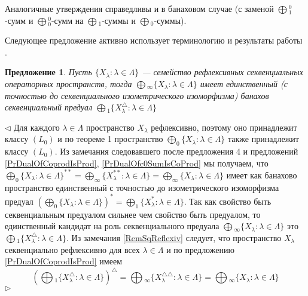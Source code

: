 \documentclass[12pt]{article}
\newtheorem{proposition}[theorem]{Предложение}
\newenvironment{proof}{\par $\triangleleft$}{$\triangleright$}
\begin{document}
Аналогичные утверждения справедливы и в банаховом случае (с заменой $\bigoplus{}_1^0$-сумм и $\bigoplus{}_0^0$-сумм на $\bigoplus{}_1$-суммы и $\bigoplus{}_0$-суммы).

Следующее предложение активно использует терминологию и результаты работы \cite{BrownItoUniquePredual}.

\begin{proposition}\label{PrUniquePredualForCoproduct}
Пусть $\{X_\lambda:\lambda\in\Lambda\}$ --- семейство рефлексивных секвенциальных операторных пространств, тогда $\bigoplus{}_\infty\{X_\lambda:\lambda\in\Lambda\}$ имеет единственный (с точностью до секвенциального изометрического изоморфизма) банахов секвенциальный предуал $\bigoplus{}_1\{X_\lambda^\triangle:\lambda\in\Lambda\}$
\end{proposition} 
\begin{proof} Для каждого $\lambda\in\Lambda$ пространство $X_\lambda$ рефлексивно, поэтому оно принадлежит классу $(L_0)$ и по теореме 1 \cite{BrownItoUniquePredual} пространство $\bigoplus_0\{X_\lambda:\lambda\in\Lambda\}$ также принадлежит классу $(L_0)$. Из замечания следовавшего после предложения 4 \cite{BrownItoUniquePredual} и предложений \ref{PrDualOfCoprodIsProd}, \ref{PrDualOfc0SumIsCoProd} мы получаем, что $\bigoplus_0\{X_\lambda:\lambda\in\Lambda\}^{**}=\bigoplus_\infty\{X_\lambda^{**}:\lambda\in\Lambda\}=\bigoplus_\infty\{X_\lambda:\lambda\in\Lambda\}$ имеет как банахово пространство единственный с точностью до изометрического изоморфизма предуал $(\bigoplus_0\{X_\lambda:\lambda\in\Lambda\})^{*}=\bigoplus_1\{X_\lambda^{*}:\lambda\in\Lambda\}$. Так как свойство быть секвенциальным предуалом сильнее чем свойство быть предуалом, то единственный кандидат на роль секвенциального предуала $\bigoplus{}_\infty\{X_\lambda:\lambda\in\Lambda\}$ это $\bigoplus{}_1\{X_\lambda^\triangle:\lambda\in\Lambda\}$. Из замечания \ref{RemSqReflexiv} следует, что пространство $X_\lambda$ секвенциально рефлексивно для всех $\lambda\in\Lambda$ и по предложению \ref{PrDualOfCoprodIsProd} имеем
$$
\left(\bigoplus{}_1\{X_\lambda^\triangle:\lambda\in\Lambda\}\right)^\triangle
=\bigoplus{}_\infty\{X_\lambda^{\triangle\triangle}:\lambda\in\Lambda\}
=\bigoplus{}_\infty\{X_\lambda:\lambda\in\Lambda\}
$$
\end{proof}
\end{document}
